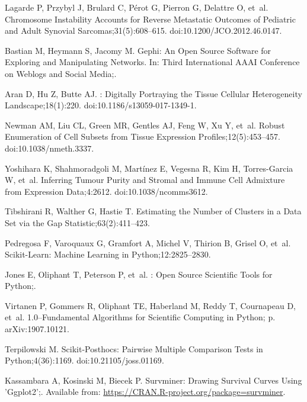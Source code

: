 \documentclass[10pt,letterpaper]{article}
\begin{document}
\begin{thebibliography}{10}
	Lagarde P, Przybyl J, Brulard C, Pérot G, Pierron G, Delattre O, et~al.
	\newblock Chromosome Instability Accounts for Reverse Metastatic Outcomes of
	Pediatric and Adult Synovial Sarcomas;31(5):608--615.
	\newblock doi:{10.1200/JCO.2012.46.0147}.
	
	Bastian M, Heymann S, Jacomy M.
	\newblock Gephi: An Open Source Software for Exploring and Manipulating
	Networks.
	\newblock In: Third International {{AAAI}} Conference on Weblogs and Social
	Media;.
	
	Aran D, Hu Z, Butte AJ.
	: Digitally Portraying the Tissue Cellular Heterogeneity
	Landscape;18(1):220.
	\newblock doi:{10.1186/s13059-017-1349-1}.
	
	Newman AM, Liu CL, Green MR, Gentles AJ, Feng W, Xu Y, et~al.
	\newblock Robust Enumeration of Cell Subsets from Tissue Expression
	Profiles;12(5):453--457.
	\newblock doi:{10.1038/nmeth.3337}.
	
	Yoshihara K, Shahmoradgoli M, Martínez E, Vegesna R, Kim H, Torres-Garcia W,
	et~al.
	\newblock Inferring Tumour Purity and Stromal and Immune Cell Admixture from
	Expression Data;4:2612.
	\newblock doi:{10.1038/ncomms3612}.
	
	Tibshirani R, Walther G, Hastie T.
	\newblock Estimating the Number of Clusters in a Data Set via the Gap
	Statistic;63(2):411--423.
	
	Pedregosa F, Varoquaux G, Gramfort A, Michel V, Thirion B, Grisel O, et~al.
	\newblock Scikit-Learn: Machine Learning in Python;12:2825--2830.
	
	Jones E, Oliphant T, Peterson P, et~al.
	: {{Open}} Source Scientific Tools for {{Python}};.
	
	Virtanen P, Gommers R, Oliphant TE, Haberland M, Reddy T, Cournapeau D, et~al.
	 1.0–{{Fundamental Algorithms}} for {{Scientific
			Computing}} in {{Python}}; p. arXiv:1907.10121.
	
	Terpilowski M.
	\newblock Scikit-Posthocs: {{Pairwise}} Multiple Comparison Tests in
	{{Python}};4(36):1169.
	\newblock doi:{10.21105/joss.01169}.
	
	Kassambara A, Kosinski M, Biecek P.
	\newblock Survminer: Drawing Survival Curves Using 'Ggplot2';.
	\newblock Available from: \url{https://CRAN.R-project.org/package=survminer}.
	

\end{thebibliography}
\end{document}
